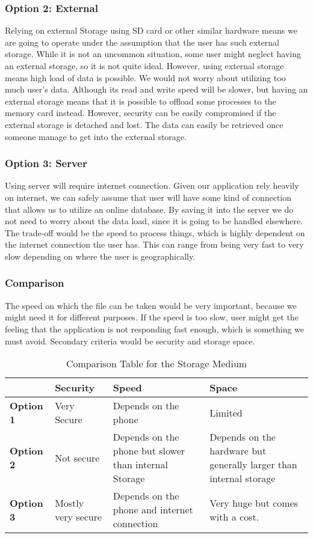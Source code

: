 \documentclass[journal,compsoc, 10pt, draftclsnofoot, onecolumn]{IEEEtran}
\begin{document}
\subsubsection*{Option 2: External}
Relying on external Storage using SD card or other similar hardware means we are
going to operate under the assumption that the user has such external storage. While
it is not an uncommon situation, some user might neglect having an external storage,
so it is not quite ideal. However, using external storage means high load of data is
possible. We would not worry about utilizing too much user's data. Although its read
and write speed will be slower, but having an external storage means that it is
possible to offload some processes to the memory card instead. However, security can
be easily compromised if the external storage is detached and lost. The data can
easily be retrieved once someone manage to get into the external storage.

\subsubsection*{Option 3: Server}
Using server will require internet connection. Given our application rely heavily on
internet, we can safely assume that user will have some kind of connection that
allows us to utilize an online database. By saving it into the server we do not need
to worry about the data load, since it is going to be handled elsewhere. The
trade-off would be the speed to process things, which is highly dependent on the
internet connection the user has. This can range from being very fast to very slow
depending on where the user is geographically.

\subsubsection{Comparison}
The speed on which the file can be taken would be very important, because we might
need it for different purposes. If the speed is too slow, user might get the feeling
that the application is not responding fast enough, which is something we must avoid.
Secondary criteria would be security and storage space.

\begin{table}[h]
	\centering
	\caption{Comparison Table for the Storage Medium}
	\label{Comparison Table for the Storage Medium}
	\begin{tabularx}{\textwidth}{|X|X|X|X|}
		\hline
\textbf{}         & \textbf{Security}                & \textbf{Speed} &\textbf{Space}		\\ \hline
		\textbf{Option 1} & Very Secure & Depends on the phone & Limited
		\\ \hline
\textbf{Option 2} & Not secure & Depends on the phone but slower than internal
Storage & Depends on the hardware but generally larger than internal storage
		\\ \hline
\textbf{Option 3} & Mostly very secure &Depends on the phone and internet connection
& Very huge but comes with a cost.
		\\ \hline
	\end{tabularx}
\end{table}
\end{document}
